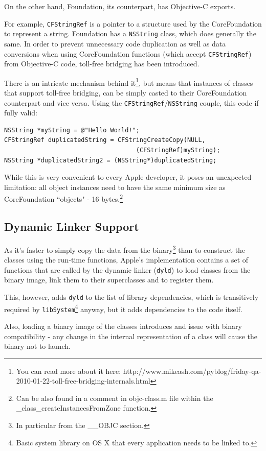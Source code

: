 \documentclass[a4paper, 11pt, fleqn]{book}
\begin{document}
On the other hand, Foundation, its counterpart, has Objective-C exports.

For example, \verb=CFStringRef= is a pointer to a structure used by the CoreFoundation to represent a string. Foundation has a \verb=NSString= class, which does generally the same. In order to prevent unnecessary code duplication as well as data conversions when using CoreFoundation functions (which accept \verb=CFStringRef=) from Objective-C code, toll-free bridging has been introduced.

There is an intricate mechanism behind it\footnote{You can read more about it here: http://www.mikeash.com/pyblog/friday-qa-2010-01-22-toll-free-bridging-internals.html}, but means that instances of classes that support toll-free bridging, can be simply casted to their CoreFoundation counterpart and vice versa. Using the \verb=CFStringRef=/\verb=NSString= couple, this code if fully valid:

\begin{verbatim}
NSString *myString = @"Hello World!";
CFStringRef duplicatedString = CFStringCreateCopy(NULL, 
                                    (CFStringRef)myString);
NSString *duplicatedString2 = (NSString*)duplicatedString;
\end{verbatim}

While this is very convenient to every Apple developer, it poses an unexpected limitation: all object instances need to have the same minimum size as CoreFoundation ``objects" - 16 bytes.\footnote{Can be also found in a comment in objc-class.m file within the \_class\_createInstancesFromZone function.}

\subsection{Dynamic Linker Support}
As it's faster to simply copy the data from the binary\footnote{In particular from the \_\_OBJC section.} than to construct the classes using the run-time functions, Apple's implementation contains a set of functions that are called by the dynamic linker (\verb=dyld=) to load classes from the binary image, link them to their superclasses and to register them.

This, however, adds \verb=dyld= to the list of library dependencies, which is transitively required by \verb=libSystem=\footnote{Basic system library on OS X that every application needs to be linked to.} anyway, but it adds dependencies to the code itself.

Also, loading a binary image of the classes introduces and issue with binary compatibility - any change in the internal representation of a class will cause the binary not to launch.
\end{document}
